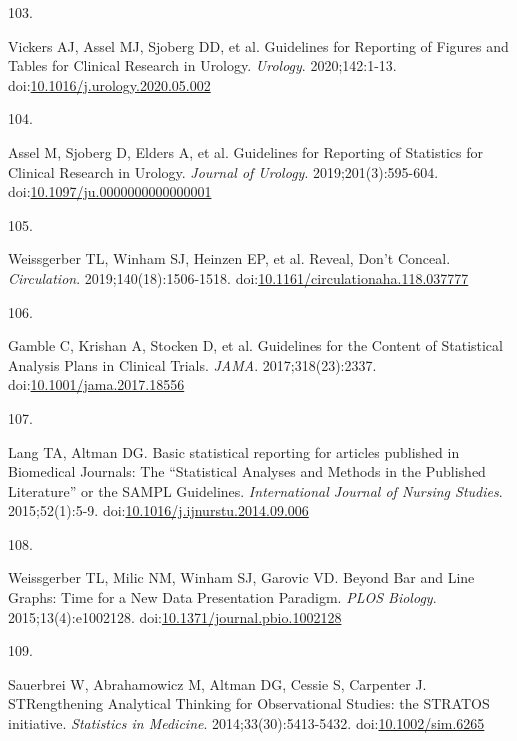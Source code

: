 \documentclass[
]{book}
\newlength{\cslhangindent}
\newlength{\csllabelwidth}
\newlength{\cslentryspacingunit} %
\newenvironment{CSLReferences}[2] %
 {%
  \setlength{\parindent}{0pt}
  \ifodd #1
  \let\oldpar\par
  \def\par{\hangindent=\cslhangindent\oldpar}
  \fi
  \setlength{\parskip}{#2\cslentryspacingunit}
 }%
 {}
\newcommand{\CSLLeftMargin}[1]{\parbox[t]{\csllabelwidth}{#1}}
\newcommand{\CSLRightInline}[1]{\parbox[t]{\linewidth - \csllabelwidth}{#1}\break}
\begin{document}
\begin{CSLReferences}{0}{0}
\leavevmode{}%
\CSLLeftMargin{103. }%
\CSLRightInline{Vickers AJ, Assel MJ, Sjoberg DD, et al. Guidelines for Reporting of Figures and Tables for Clinical Research in Urology. \emph{Urology}. 2020;142:1-13. doi:\href{https://doi.org/10.1016/j.urology.2020.05.002}{10.1016/j.urology.2020.05.002}}

\leavevmode{}%
\CSLLeftMargin{104. }%
\CSLRightInline{Assel M, Sjoberg D, Elders A, et al. Guidelines for Reporting of Statistics for Clinical Research in Urology. \emph{Journal of Urology}. 2019;201(3):595-604. doi:\href{https://doi.org/10.1097/ju.0000000000000001}{10.1097/ju.0000000000000001}}

\leavevmode{}%
\CSLLeftMargin{105. }%
\CSLRightInline{Weissgerber TL, Winham SJ, Heinzen EP, et al. Reveal, Don{'}t Conceal. \emph{Circulation}. 2019;140(18):1506-1518. doi:\href{https://doi.org/10.1161/circulationaha.118.037777}{10.1161/circulationaha.118.037777}}

\leavevmode{}%
\CSLLeftMargin{106. }%
\CSLRightInline{Gamble C, Krishan A, Stocken D, et al. Guidelines for the Content of Statistical Analysis Plans in Clinical Trials. \emph{JAMA}. 2017;318(23):2337. doi:\href{https://doi.org/10.1001/jama.2017.18556}{10.1001/jama.2017.18556}}

\leavevmode{}%
\CSLLeftMargin{107. }%
\CSLRightInline{Lang TA, Altman DG. Basic statistical reporting for articles published in Biomedical Journals: The {``}Statistical Analyses and Methods in the Published Literature{''} or the SAMPL Guidelines. \emph{International Journal of Nursing Studies}. 2015;52(1):5-9. doi:\href{https://doi.org/10.1016/j.ijnurstu.2014.09.006}{10.1016/j.ijnurstu.2014.09.006}}

\leavevmode{}%
\CSLLeftMargin{108. }%
\CSLRightInline{Weissgerber TL, Milic NM, Winham SJ, Garovic VD. Beyond Bar and Line Graphs: Time for a New Data Presentation Paradigm. \emph{PLOS Biology}. 2015;13(4):e1002128. doi:\href{https://doi.org/10.1371/journal.pbio.1002128}{10.1371/journal.pbio.1002128}}

\leavevmode{}%
\CSLLeftMargin{109. }%
\CSLRightInline{Sauerbrei W, Abrahamowicz M, Altman DG, Cessie S, Carpenter J. STRengthening Analytical Thinking for Observational Studies: the STRATOS initiative. \emph{Statistics in Medicine}. 2014;33(30):5413-5432. doi:\href{https://doi.org/10.1002/sim.6265}{10.1002/sim.6265}}


\end{CSLReferences}
\end{document}

